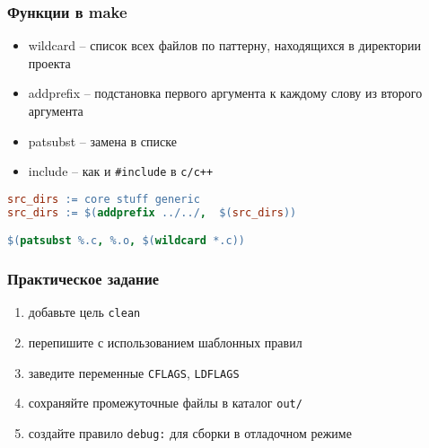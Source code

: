 \begin{frame}[fragile]
	\frametitle{Функции в make}

	\begin{itemize}
		\item wildcard -- список всех файлов по паттерну,  находящихся в директории проекта
		\item addprefix -- подстановка первого аргумента к каждому слову из второго аргумента
		\item patsubst -- замена в списке
		\item include -- как и {\tt \#include} в {\tt c/c++}
	\end{itemize}

	\begin{lstlisting}[language=make]
src_dirs := core stuff generic
src_dirs := $(addprefix ../../,  $(src_dirs))

$(patsubst %.c, %.o, $(wildcard *.c))
	\end{lstlisting}

\end{frame}

\begin{frame}[fragile]
	\frametitle{Практическое задание}

	\begin{enumerate}
		\item добавьте цель {\tt clean}
		\item перепишите с использованием шаблонных правил
		\item заведите переменные {\tt CFLAGS}, {\tt LDFLAGS}
		\item сохраняйте промежуточные файлы в каталог {\tt out/}
		\item создайте правило {\tt debug:} для сборки в отладочном режиме
	\end{enumerate}
\end{frame}

